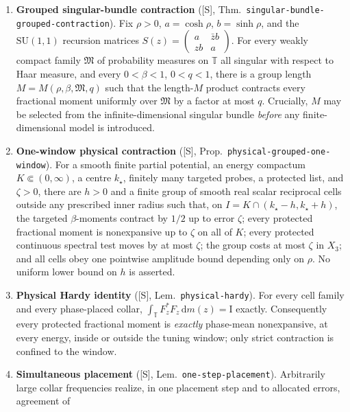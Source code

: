 \documentclass[11pt]{article}
\theoremstyle{remark}
\theoremstyle{definition}
\newcommand{\T}{\mathbb T}
\newcommand{\Id}{\mathrm I}
\newcommand{\dd}{\,\mathrm d}
\begin{document}
\begin{enumerate}[label=\textup{(B\arabic*)},leftmargin=*]
 \item \textbf{Grouped singular-bundle contraction} ([S], Thm.\
       \texttt{singular-bundle-grouped-contraction}).  Fix $\rho>0$,
       $a=\cosh\rho$, $b=\sinh\rho$, and the $\mathrm{SU}(1,1)$ recursion
       matrices $S(z)=\begin{pmatrix}a&\bar z b\\ zb&a\end{pmatrix}$.  For
       every weakly compact family $\mathfrak M$ of probability measures on
       $\T$ all singular with respect to Haar measure, and every
       $0<\beta<1$, $0<q<1$, there is a group length $M=M(\rho,\beta,
       \mathfrak M,q)$ such that the length-$M$ product contracts every
       fractional moment uniformly over $\mathfrak M$ by a factor at most
       $q$.  Crucially, $M$ may be selected from the infinite-dimensional
       singular bundle \emph{before} any finite-dimensional model is
       introduced.
 \item \textbf{One-window physical contraction} ([S], Prop.\
       \texttt{physical-grouped-one-window}).  For a smooth finite partial
       potential, an energy compactum $K\Subset(0,\infty)$, a centre
       $k_\star$, finitely many targeted probes, a protected list, and
       $\zeta>0$, there are $h>0$ and a finite group of smooth real scalar
       reciprocal cells outside any prescribed inner radius such that, on
       $I=K\cap(k_\star-h,k_\star+h)$, the targeted $\beta$-moments contract
       by $1/2$ up to error $\zeta$; every protected fractional moment is
       nonexpansive up to $\zeta$ on all of $K$; every protected continuous
       spectral test moves by at most $\zeta$; the group costs at most
       $\zeta$ in $X_3$; and all cells obey one pointwise amplitude bound
       depending only on $\rho$.  No uniform lower bound on $h$ is asserted.
 \item \textbf{Physical Hardy identity} ([S], Lem.\ \texttt{physical-hardy}).
       For every cell family and every phase-placed collar,
       $\int_\T F_z^*F_z\dd m(z)=\Id$ exactly.  Consequently every protected
       fractional moment is \emph{exactly} phase-mean nonexpansive, at every
       energy, inside or outside the tuning window; only strict contraction
       is confined to the window.
 \item \textbf{Simultaneous placement} ([S], Lem.\
       \texttt{one-step-placement}).  Arbitrarily large collar frequencies
       realize, in one placement step and to allocated errors, agreement of

\end{enumerate}
\end{document}
